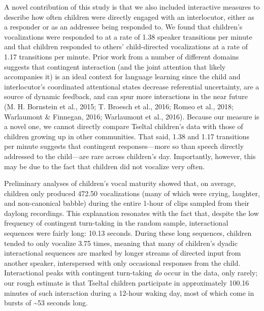 \documentclass[floatsintext,man]{apa6}
\theoremstyle{definition}
\theoremstyle{definition}
\theoremstyle{definition}
\theoremstyle{remark}
\begin{document}
A novel contribution of this study is that we also included interactive
measures to describe how often children were directly engaged with an
interlocutor, either as a responder or as an addressee being responded
to. We found that children's vocalizations were responded to at a rate
of 1.38 speaker transitions per minute and that children responded to
others' child-directed vocalizations at a rate of 1.17 transitions per
minute. Prior work from a number of different domains suggests that
contingent interaction (and the joint attention that likely accompanies
it) is an ideal context for language learning since the child and
interlocutor's coordinated attentional states decrease referential
uncertainty, are a source of dynamic feedback, and can spur more
interactions in the near future (M. H. Bornstein et al., 2015; T.
Broesch et al., 2016; Romeo et al., 2018; Warlaumont \& Finnegan, 2016;
Warlaumont et al., 2016). Because our measure is a novel one, we cannot
directly compare Tseltal children's data with those of children growing
up in other communities. That said, 1.38 and 1.17 transitions per minute
suggests that contingent responses---more so than speech directly
addressed to the child---are rare across children's day. Importantly,
however, this may be due to the fact that children did not vocalize very
often.

Preliminary analyses of children's vocal maturity showed that, on
average, children only produced 472.50 vocalizations (many of which were
crying, laughter, and non-canonical babble) during the entire 1-hour of
clips sampled from their daylong recordings. This explanation resonates
with the fact that, despite the low frequency of contingent turn-taking
in the random sample, interactional sequences were fairly long: 10.13
seconds. During these long sequences, children tended to only vocalize
3.75 times, meaning that many of children's dyadic interactional
sequences are marked by longer streams of directed input from another
speaker, interspersed with only occasional responses from the child.
Interactional peaks with contingent turn-taking \emph{do} occur in the
data, only rarely; our rough estimate is that Tseltal children
participate in approximately 100.16 minutes of such interaction during a
12-hour waking day, most of which come in bursts of \textasciitilde{}53
seconds long.
\end{document}
